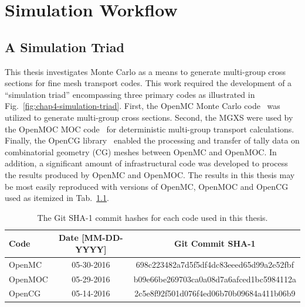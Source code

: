 \chapter{Simulation Workflow}
\label{chap:workflow}

\section{A Simulation Triad}
\label{chap4:triad}

This thesis investigates Monte Carlo as a means to generate multi-group cross sections for fine mesh transport codes. This work required the development of a ``simulation triad'' encompassing three primary codes as illustrated in Fig.~\ref{fig:chap4-simulation-triad}. First, the OpenMC Monte Carlo code~\cite{romano2013openmc} was utilized to generate multi-group cross sections. Second, the \ac{MGXS} were used by the OpenMOC \ac{MOC} code~\cite{boyd2014openmoc} for deterministic multi-group transport calculations. Finally, the OpenCG library~\cite{boyd2015opencg} enabled the processing and transfer of tally data on combinatorial geometry (CG) meshes between OpenMC and OpenMOC. In addition, a significant amount of infrastructural code was developed to process the results produced by OpenMC and OpenMOC. The results in this thesis may be most easily reproduced with versions of OpenMC, OpenMOC and OpenCG used as itemized in Tab.~\ref{table:chap4-git-shas}.

\begin{table}[hb!]
  \centering
  \caption[OpenMC, OpenMOC and OpenCG Git SHA-1 hashes]{The Git SHA-1 commit hashes for each code used in this thesis.}
  \small
  \label{table:chap4-git-shas} 
  \vspace{6pt}
  \begin{tabular}{l c c}
  \toprule
  \rowcolor{lightgray}
  {\bf Code} &
  {\bf Date [MM-DD-YYYY]} &
  {\bf Git Commit SHA-1} \\
  \midrule
  OpenMC & 05-30-2016 & 698c223482a7d5f5df4dc83eeed65d99a2e52fbf \\
  OpenMOC & 05-29-2016 & b09e66be269703ca0a08d7a6afced1bc5984112a \\
  OpenCG & 05-14-2016 & 2c5e8f92f501d076f4ed06b70b09684a411b06b9 \\
  \bottomrule
\end{tabular}
\end{table}

